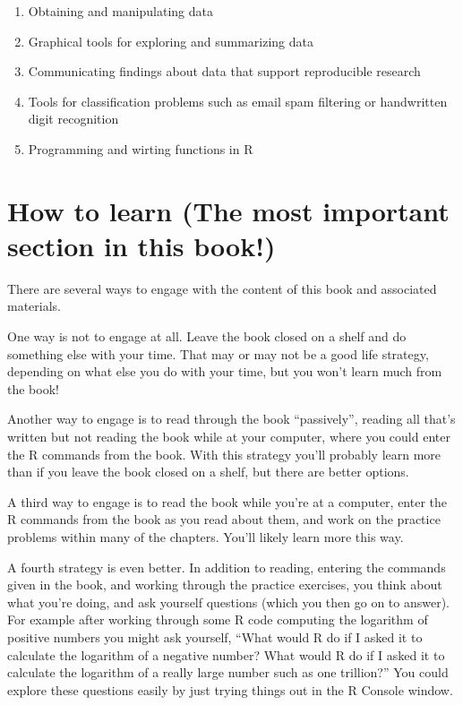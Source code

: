 \documentclass[]{krantz}
\providecommand{\tightlist}{%
  \setlength{\itemsep}{0pt}\setlength{\parskip}{0pt}}
\begin{document}
\begin{enumerate}
\def\labelenumi{\arabic{enumi}.}
\tightlist
\item
  Obtaining and manipulating data
\item
  Graphical tools for exploring and summarizing data
\item
  Communicating findings about data that support reproducible research
\item
  Tools for classification problems such as email spam filtering or
  handwritten digit recognition
\item
  Programming and wirting functions in R
\end{enumerate}

\section{How to learn (The most important section in this
book!)}\label{how-to-learn-the-most-important-section-in-this-book}

There are several ways to engage with the content of this book and
associated materials.

One way is not to engage at all. Leave the book closed on a shelf and do
something else with your time. That may or may not be a good life
strategy, depending on what else you do with your time, but you won't
learn much from the book!

Another way to engage is to read through the book ``passively'', reading
all that's written but not reading the book while at your computer,
where you could enter the R commands from the book. With this strategy
you'll probably learn more than if you leave the book closed on a shelf,
but there are better options.

A third way to engage is to read the book while you're at a computer,
enter the R commands from the book as you read about them, and work on
the practice problems within many of the chapters. You'll likely learn
more this way.

A fourth strategy is even better. In addition to reading, entering the
commands given in the book, and working through the practice exercises,
you think about what you're doing, and ask yourself questions (which you
then go on to answer). For example after working through some R code
computing the logarithm of positive numbers you might ask yourself,
``What would R do if I asked it to calculate the logarithm of a negative
number? What would R do if I asked it to calculate the logarithm of a
really large number such as one trillion?'' You could explore these
questions easily by just trying things out in the R Console window.
\end{document}
